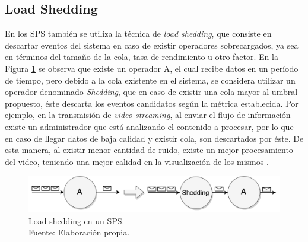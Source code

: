 

\subsection{Load Shedding}
\label{sec:loadSheddingBC}

En los SPS tambi\'en se utiliza la t\'ecnica de \textit{load shedding}, que consiste en descartar eventos del sistema en caso de existir operadores sobrecargados, ya sea \normalsize{en t\'erminos del} tama\~no de la cola, tasa de rendimiento u otro factor. En la Figura \ref{fig:loadShedding} se observa que existe un operador A, el cual recibe datos en un per\'iodo de tiempo, pero debido a la cola existente en el sistema, se considera utilizar un operador denominado \textit{Shedding}, que en caso de existir una cola mayor al umbral propuesto, \'este descarta los eventos candidatos seg\'un la m\'etrica establecida. Por ejemplo, en la transmisi\'on de \textit{video streaming}, al enviar el flujo de informaci\'on existe un administrador que est\'a analizando el contenido a procesar, por lo que en caso de llegar datos de baja calidad y existir cola, son descartados por \'este. De esta manera, al existir menor cantidad de ruido, existe un mejor procesamiento del video, teniendo una mejor calidad en la visualizaci\'on de los mismos \citep{SheuC09}. 

\begin{figure}[!ht]
	\centering
	\includegraphics[scale=0.6]{images/LoadShedding.pdf}
	\caption[Load shedding en un SPS.]{Load shedding en un SPS.\\Fuente: Elaboraci\'on propia.}
	\label{fig:loadShedding}
\end{figure}

